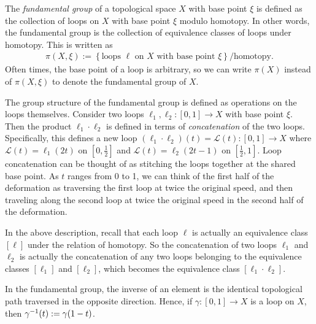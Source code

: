 \begin{definition}
    The \textit{fundamental group} of a topological space $X$ with base point $\xi$ is defined as the collection of loops on $X$ with base point $\xi$ modulo homotopy. In other words, the fundamental group is the collection of equivalence classes of loops under homotopy. This is written as
    \begin{align*}
        \pi(X,\xi):=\left\{ \textrm{loops }\ell \textrm{ on }X \textrm{ with base point }\xi \right\}/\textrm{homotopy}.
    \end{align*}
    Often times, the base point of a loop is arbitrary, so we can write $\pi(X)$ instead of $\pi(X,\xi)$ to denote the fundamental group of $X$.
\end{definition}

The group structure of the fundamental group is defined as operations on the loops themselves. Consider two loops $\ell_1,\ell_2:[0,1]\to X$ with base point $\xi$. Then the product $\ell_1\cdot\ell_2$ is defined in terms of \textit{concatenation} of the two loops. Specifically, this defines a new loop $(\ell_1\cdot\ell_2)(t)=\mathcal{L}(t):[0,1]\to X$ where $\mathcal{L}(t) = \ell_1(2t)$ on $\left[ 0,\frac{1}{2} \right]$ and $\mathcal{L}(t) = \ell_2(2t-1)$ on $\left[ \frac{1}{2},1 \right]$. Loop concatenation can be thought of as stitching the loops together at the shared base point. As $t$ ranges from 0 to 1, we can think of the first half of the deformation as traversing the first loop at twice the original speed, and then traveling along the second loop at twice the original speed in the second half of the deformation. 

In the above description, recall that each loop $\ell$ is actually an equivalence class $\left[ \ell \right]$ under the relation of homotopy. So the concatenation of two loops $\ell_1$ and $\ell_2$ is actually the concatenation of any two loops belonging to the equivalence classes $\left[ \ell_1 \right]$ and $\left[ \ell_2 \right]$, which becomes the equivalence class $\left[ \ell_1\cdot\ell_2 \right]$.

In the fundamental group, the inverse of an element is the identical topological path traversed in the opposite direction. Hence, if $\gamma:[0,1]\to X$ is a loop on $X$, then ${ \gamma }^{-1}(t) := \gamma(1-t)$.


